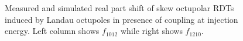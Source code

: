 \begin{figure}[!htb]
\begin{subfigure}{0.47\textwidth}
    \end{subfigure}
    \caption{Measured and simulated real part shift of skew octupolar RDTs induced by Landau
    octupoles in presence of coupling at injection energy. Left column shows $f_{1012}$ while right
    shows $f_{1210}$.}
    \label{fig:skew_octupolar:response_meas_sim_coupling}
\end{figure}


